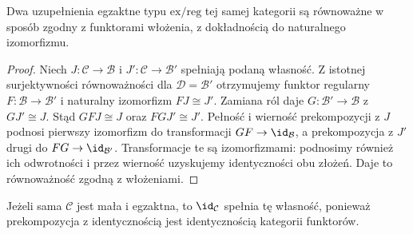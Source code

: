 \begin{stwierdzenie}\label{cat:prop:barr-exact-completion-unique}
Dwa uzupełnienia egzaktne typu $\mathrm{ex/reg}$ tej samej kategorii są równoważne w sposób zgodny z funktorami włożenia, z dokładnością do naturalnego izomorfizmu.
\end{stwierdzenie}
\begin{proof}
Niech $J:\mathcal C\to\mathcal B$ i $J':\mathcal C\to\mathcal B'$ spełniają podaną własność. Z istotnej surjektywności równoważności dla $\mathcal D=\mathcal B'$ otrzymujemy funktor regularny $F:\mathcal B\to\mathcal B'$ i naturalny izomorfizm $FJ\cong J'$. Zamiana ról daje $G:\mathcal B'\to\mathcal B$ z $GJ'\cong J$. Stąd $GFJ\cong J$ oraz $FGJ'\cong J'$. Pełność i wierność prekompozycji z $J$ podnosi pierwszy izomorfizm do transformacji $GF\to\id_{\mathcal B}$, a prekompozycja z $J'$ drugi do $FG\to\id_{\mathcal B'}$. Transformacje te są izomorfizmami: podnosimy również ich odwrotności i przez wierność uzyskujemy identyczności obu złożeń. Daje to równoważność zgodną z włożeniami.
\end{proof}

Jeżeli sama $\mathcal C$ jest mała i egzaktna, to $\id_{\mathcal C}$ spełnia tę własność, ponieważ prekompozycja z identycznością jest identycznością kategorii funktorów.

